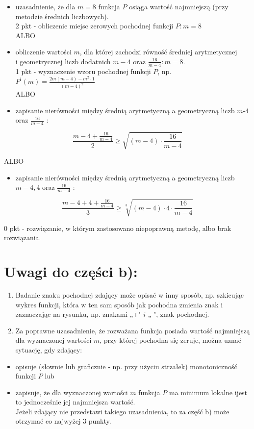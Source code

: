 \documentclass[10pt]{article}
\begin{document}
\begin{itemize}
  \item uzasadnienie, że dla $m=8$ funkcja $P$ osiąga wartość najmniejszą (przy metodzie średnich liczbowych).\\
2 pkt - obliczenie miejsc zerowych pochodnej funkcji $P: m=8$\\
ALBO
  \item obliczenie wartości $m$, dla której zachodzi równość średniej arytmetycznej\\
i geometrycznej liczb dodatnich $m-4$ oraz $\frac{16}{m-4}: m=8$.\\
1 pkt - wyznaczenie wzoru pochodnej funkcji $P$, np. $P^{\prime}(m)=\frac{2 m(m-4)-m^{2} \cdot 1}{(m-4)^{2}}$\\
ALBO
  \item zapisanie nierówności między średnią arytmetyczną a geometryczną liczb $m$-4 oraz $\frac{16}{m-4}$ :
\end{itemize}

$$
\frac{m-4+\frac{16}{m-4}}{2} \geq \sqrt{(m-4) \cdot \frac{16}{m-4}}
$$

ALBO

\begin{itemize}
  \item zapisanie nierówności między średnią arytmetyczną a geometryczną liczb $m-4,4$ oraz $\frac{16}{m-4}$ :
\end{itemize}

$$
\frac{m-4+4+\frac{16}{m-4}}{3} \geq \sqrt[3]{(m-4) \cdot 4 \cdot \frac{16}{m-4}}
$$

0 pkt - rozwiązanie, w którym zastosowano niepoprawną metodę, albo brak rozwiązania.

\section*{Uwagi do części b):}
\begin{enumerate}
  \item Badanie znaku pochodnej zdający może opisać w inny sposób, np. szkicując wykres funkcji, która w ten sam sposób jak pochodna zmienia znak i zaznaczając na rysunku, np. znakami „+" $i$ „-", znak pochodnej.
  \item Za poprawne uzasadnienie, że rozważana funkcja posiada wartość najmniejszą dla wyznaczonej wartości $m$, przy której pochodna się zeruje, można uznać sytuację, gdy zdający:
\end{enumerate}

\begin{itemize}
  \item opisuje (słownie lub graficznie - np. przy użyciu strzałek) monotoniczność funkcji $P$ lub
  \item zapisuje, że dla wyznaczonej wartości $m$ funkcja $P$ ma minimum lokalne ijest to jednocześnie jej najmniejsza wartość.\\
Jeżeli zdający nie przedstawi takiego uzasadnienia, to za część b) może otrzymać co najwyżej 3 punkty.
\end{itemize}
\end{document}
